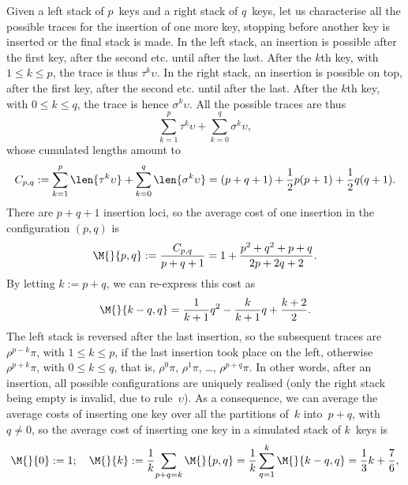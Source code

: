 Given a left stack of \(p\)~keys and a right stack of \(q\)~keys, let
us characterise all the possible traces for the insertion of one more
key, stopping before another key is inserted or the final stack is
made. In the left stack, an insertion is possible after the first key,
after the second etc. until after the last. After the \(k\)th key,
with \(1 \leqslant k \leqslant p\), the trace is thus
\(\tau^k\upsilon\). In the right stack, an insertion is possible on
top, after the first key, after the second etc. until after the
last. After the \(k\)th key, with \(0 \leqslant k \leqslant q\), the
trace is hence \(\sigma^k\upsilon\). All the possible traces are thus
\begin{equation*}
\sum_{k=1}^{p}{\tau^k\upsilon} + \sum_{k=0}^{q}{\sigma^k\upsilon},
\end{equation*}
whose cumulated lengths amount to
\begin{equation*}
C_{p,q} := \sum_{k=1}^{p}\len{\tau^k\upsilon} +
\sum_{k=0}^{q}\len{\sigma^k\upsilon}
= (p+q+1) + \frac{1}{2}p(p+1) + \frac{1}{2}q(q+1).
\end{equation*}
There are \(p+q+1\) insertion loci, so the average cost of one
insertion in the configuration \((p,q)\) is
\begin{equation}
\M{}{p,q} := \frac{C_{p,q}}{p+q+1}
           = 1 + \frac{p^2 + q^2 + p + q}{2p + 2q + 2}.
\label{eq:Mpq}
\end{equation}
By letting \(k := p + q\), we can re\hyp{}express this cost as
\begin{equation*}
\M{}{k-q,q} = \frac{1}{k+1}{q^2} - \frac{k}{k+1}{q} + \frac{k+2}{2}.
\end{equation*}
The left stack is reversed after the last insertion, so the subsequent
traces are \(\rho^{p-k}\pi\), with \(1 \leqslant k \leqslant p\), if
the last insertion took place on the left, otherwise
\(\rho^{p+k}\pi\), with \(0 \leqslant k \leqslant q\), that is,
\(\rho^0\pi\), \(\rho^1\pi\), \ldots, \(\rho^{p+q}\pi\). In other
words, after an insertion, all possible configurations are uniquely
realised (only the right stack being empty is invalid, due to
rule~\(\upsilon\)). As a consequence, we can average the average costs
of inserting one key over all the partitions of~\(k\) into~\(p + q\),
with \(q \neq 0\), so the average cost of inserting one key in a
simulated stack of \(k\)~keys is
\begin{equation*}
\M{}{0} := 1;\quad
\M{}{k} := \frac{1}{k}\!\sum_{p+q=k}\M{}{p,q}
         = \frac{1}{k}\sum_{q=1}^{k}\M{}{k-q,q}
         = \frac{1}{3}k + \frac{7}{6},
\end{equation*}

